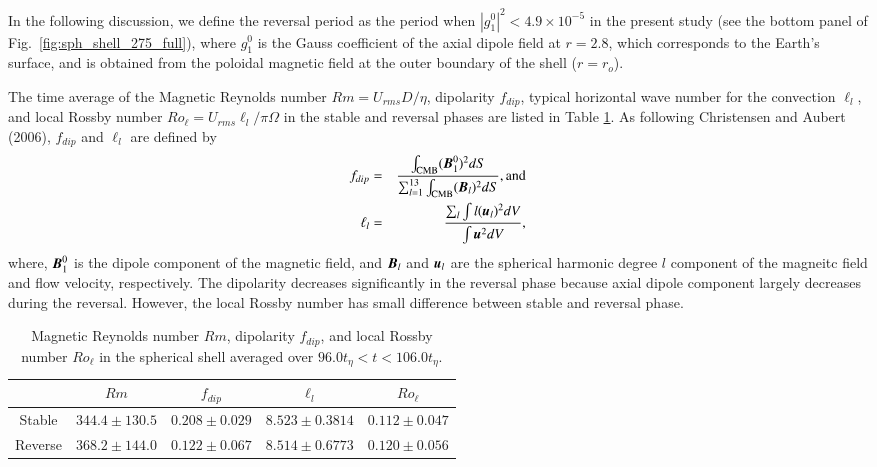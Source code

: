 {\color{blue}
In the following discussion, we define the reversal period as the period when $\left| g_{1}^{0} \right|^2 < 4.9 \times 10^{-5}$ in the present study (see the bottom panel of Fig.~\ref{fig:sph_shell_275_full}), where $g_{1}^{0}$ is the Gauss coefficient of the axial dipole field at $r=2.8$, which corresponds to the Earth’s surface, and is obtained from the poloidal magnetic field at the outer boundary of the shell ($r=r_o$).
%

% 

%
The time average of the Magnetic Reynolds number $Rm = U_{rms} D / \eta$, dipolarity $f_{dip}$, typical horizontal wave number for the convection $\ell_{l}$, and local Rossby number $Ro_{\ell} = U_{rms} \ell_{l} / \pi \Omega $ in the stable and reversal phases are listed in Table \ref{table:average_dipolarity}. As following Christensen and Aubert (2006), $f_{dip} $ and $\ell_{l}$ are defined by
%
\begin{eqnarray}
f_{dip} &=& \frac{\int_{\rm{CMB}} (\mbox{\boldmath$B$}_{1}^{0})^2 dS}{\sum_{l=1}^{13} \int_{\rm{CMB}} (\mbox{\boldmath$B$}_l)^2 dS}, \mbox{and} \\
\ell_{l} &=& \frac{\sum_{l} \int l(\mbox{\boldmath$u$}_{l})^2 dV}{\int \mbox{\boldmath$u$}^2 dV},
\end{eqnarray}
where, $\mbox{\boldmath$B$}_{1}^{0}$ is the dipole component of the magnetic field, and $\mbox{\boldmath$B$}_{l}$ and $\mbox{\boldmath$u$}_{l}$ are the spherical harmonic degree $l$ component of the magneitc field and flow velocity, respectively.
%
The dipolarity decreases significantly in the reversal phase because axial dipole component largely decreases during the reversal. However, the local Rossby number has small difference between stable and reversal phase.
}
%
\begin{table}[h]
\caption{Magnetic Reynolds number $Rm$, dipolarity $f_{dip}$, and local Rossby number $Ro_{\ell}$ in the spherical shell averaged over $96.0 t_{\eta} < t < 106.0 t_{\eta}$.}
\label{table:average_dipolarity}
\begin{tabular}{ccccc}
 & $Rm$ & $f_{dip}$ & 
  ${\ell}_{l}$ & $Ro_{\ell}$ \\ \hline
\mbox{Stable} & $344.4 \pm 130.5 $ &
                $0.208 \pm 0.029$ &
                $8.523 \pm 0.3814$ & 
                $0.112 \pm 0.047$ \\
\mbox{Reverse} & $368.2 \pm 144.0 $ &
                 $0.122 \pm 0.067$ &
                 $8.514 \pm 0.6773$ & 
                 $0.120 \pm 0.056$\\ \hline
\end{tabular}
\end{table}
%

